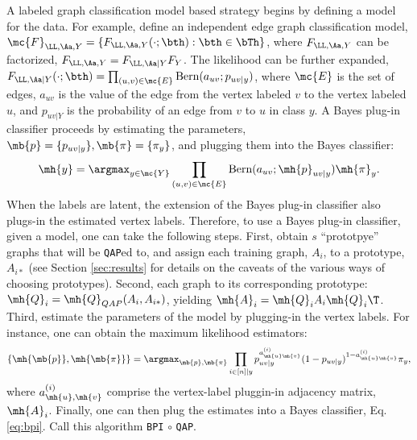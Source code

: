 \documentclass[10pt,journal,cspaper,compsoc]{IEEEtran}
\begin{document}
A labeled graph classification model based strategy begins by defining a model for the data. For example, \cite{Vogelstein2011} define an independent edge graph classification model, $\mc{F}_{\LL,\Aa,Y}=\{F_{\LL,\Aa,Y}(\cdot; \bth) : \bth \in \bTh \}$, where $F_{\LL,\Aa,Y}$ can be factorized,  $F_{\LL,\Aa, Y } = F_{\LL,\Aa | Y} F_{Y}$. The likelihood can be further expanded,%
	$F_{\LL,\Aa| Y }(\cdot; \bth) =\prod_{(u,v) \in \mc{E}}\text{Bern}(a_{uv}; p_{uv|y})$,
where $\mc{E}$ is the set of edges, $a_{uv}$ is the value of the edge from the vertex labeled $v$ to the vertex labeled $u$, and $p_{uv|Y}$ is the probability of an edge from $v$ to $u$ in class $y$.  A Bayes plug-in classifier proceeds by estimating the parameters, $\mb{p}=\{p_{uv|y}\}, \mb{\pi}=\{\pi_y\}$, and plugging them into the Bayes classifier:
\begin{align} \label{eq:bpi}
	\mh{y} = \argmax_{y \in \mc{Y}} \prod_{(u,v) \in \mc{E}}\text{Bern}(a_{uv}; \mh{p}_{uv|y})  \mh{\pi}_y.
\end{align}
When the labels are latent, the extension of the Bayes plug-in classifier also plugs-in the estimated vertex labels. %
Therefore, to use a Bayes plug-in classifier, given a model, one can take the following steps.  First, obtain $s$ ``prototpye'' graphs that will be \texttt{QAP}ed to, and assign each training graph, $A_i$, to a prototype, $A_{i*}$  (see Section \ref{sec:results} for details on the caveats of the various ways of choosing prototypes).  Second, \qap each graph to its corresponding prototype:  $\mh{Q}_i=\mh{Q}_{QAP}(A_i,A_{i*})$, yielding $\mh{A}_i=\mh{Q}_i A_i \mh{Q}_i\T$.  Third, estimate the parameters of the model by plugging-in the vertex labels.  For instance, one can obtain the maximum likelihood estimators:
\begin{align}
	\{\mh{\mb{p}},\mh{\mb{\pi}}\} = \argmax_{\mb{p},\mb{\pi}} \prod_{i \in [n] | y } p_{uv|y}^{a_{\mh{u}\mh{v}}^{(i)}}(1-p_{uv|y})^{1-a_{\mh{u}\mh{v}}^{(i)}} \pi_y,
\end{align}
where $a_{\mh{u},\mh{v}}^{(i)}$ comprise the vertex-label pluggin-in adjacency matrix, $\mh{A}_i$. Finally, one can then plug the estimates into a Bayes classifier, Eq. \eqref{eq:bpi}.  Call this algorithm \texttt{BPI} $\circ$ \texttt{QAP}.
\end{document}
